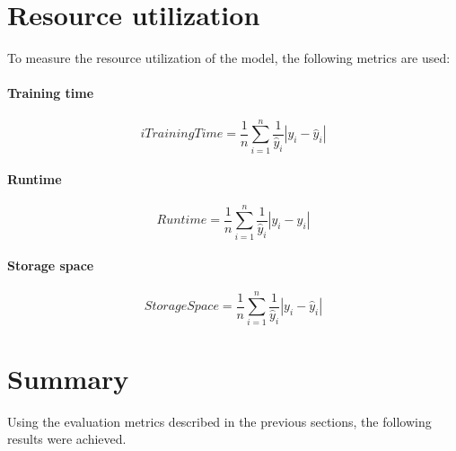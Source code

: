 \section{Resource utilization}

To measure the resource utilization of the model, the following metrics are used:

\paragraph*{Training time}

\begin{equation}i
    \label{eq:training_time}
    Training Time = \frac{1}{n} \sum_{i=1}^{n} \frac{1}{\hat{y}_i} |y_i - \hat{y}_i|
\end{equation}

\paragraph*{Runtime}

\begin{equation}
    \label{eq:runtime}
    Runtime = \frac{1}{n} \sum_{i=1}^{n} \frac{1}{\hat{y}_i} |y_i - \hat{y}_i|
\end{equation}

\paragraph*{Storage space}

\begin{equation}
    \label{eq:storage_space}
    Storage Space = \frac{1}{n} \sum_{i=1}^{n} \frac{1}{\hat{y}_i} |y_i - \hat{y}_i|
\end{equation}

\section{Summary}
Using the evaluation metrics described in the previous sections, the following results were achieved.
